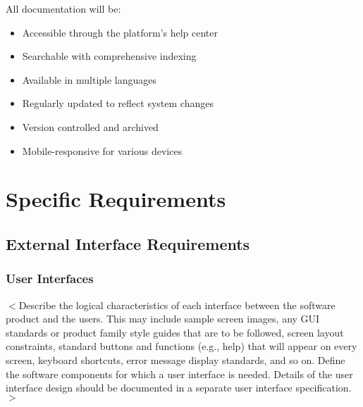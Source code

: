 \documentclass[a4paper, 11pt]{scrreprt}
\begin{document}
All documentation will be:
\begin{itemize}
    \item Accessible through the platform's help center
    \item Searchable with comprehensive indexing
    \item Available in multiple languages
    \item Regularly updated to reflect system changes
    \item Version controlled and archived
    \item Mobile-responsive for various devices
\end{itemize}


\chapter{Specific Requirements}

\section{External Interface Requirements}
\subsection{User Interfaces}
$<$Describe the logical characteristics of each interface between the software 
product and the users. This may include sample screen images, any GUI standards 
or product family style guides that are to be followed, screen layout 
constraints, standard buttons and functions (e.g., help) that will appear on 
every screen, keyboard shortcuts, error message display standards, and so on.  
Define the software components for which a user interface is needed. Details of 
the user interface design should be documented in a separate user interface 
specification.$>$
\end{document}
